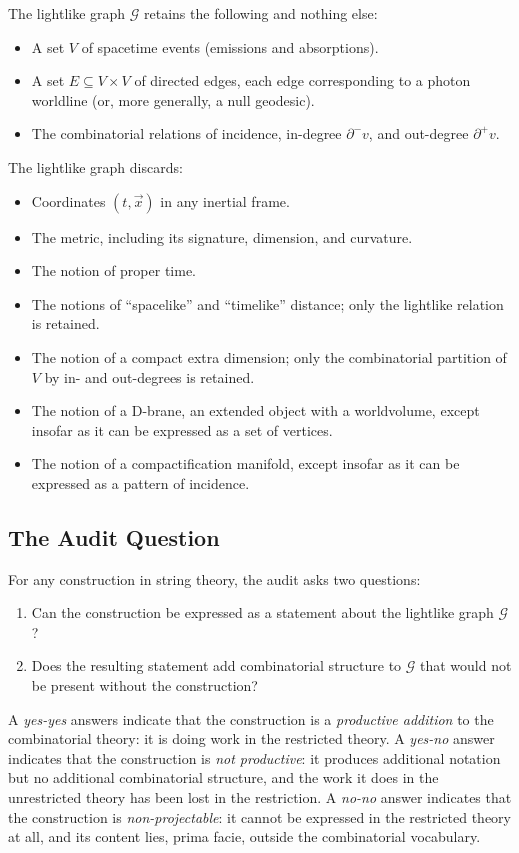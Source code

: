 \documentclass[11pt]{article}
\begin{document}
The lightlike graph $\mathcal{G}$ retains the following and nothing else:
\begin{itemize}
    \item A set $V$ of spacetime events (emissions and absorptions).
    \item A set $E \subseteq V \times V$ of directed edges, each edge corresponding to a photon worldline (or, more generally, a null geodesic).
    \item The combinatorial relations of incidence, in-degree $\partial^- v$, and out-degree $\partial^+ v$.
\end{itemize}
The lightlike graph discards:
\begin{itemize}
    \item Coordinates $(t, \vec{x})$ in any inertial frame.
    \item The metric, including its signature, dimension, and curvature.
    \item The notion of proper time.
    \item The notions of ``spacelike'' and ``timelike'' distance; only the lightlike relation is retained.
    \item The notion of a compact extra dimension; only the combinatorial partition of $V$ by in- and out-degrees is retained.
    \item The notion of a D-brane, an extended object with a worldvolume, except insofar as it can be expressed as a set of vertices.
    \item The notion of a compactification manifold, except insofar as it can be expressed as a pattern of incidence.
\end{itemize}

\subsection{The Audit Question}

For any construction in string theory, the audit asks two questions:
\begin{enumerate}
    \item Can the construction be expressed as a statement about the lightlike graph $\mathcal{G}$?
    \item Does the resulting statement add combinatorial structure to $\mathcal{G}$ that would not be present without the construction?
\end{enumerate}
A \emph{yes-yes} answers indicate that the construction is a \emph{productive addition} to the combinatorial theory: it is doing work in the restricted theory. A \emph{yes-no} answer indicates that the construction is \emph{not productive}: it produces additional notation but no additional combinatorial structure, and the work it does in the unrestricted theory has been lost in the restriction. A \emph{no-no} answer indicates that the construction is \emph{non-projectable}: it cannot be expressed in the restricted theory at all, and its content lies, prima facie, outside the combinatorial vocabulary.
\end{document}
